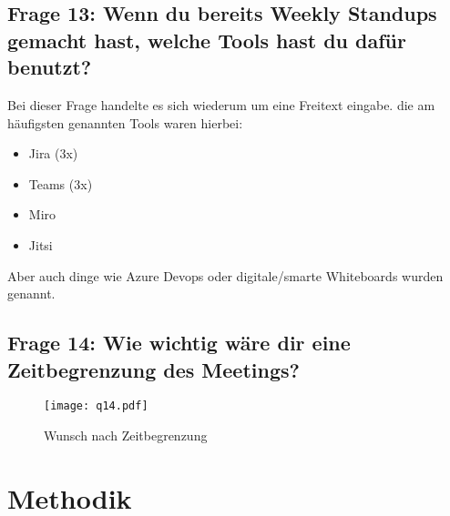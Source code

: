 \subsection{Frage 13: Wenn du bereits Weekly Standups gemacht hast, welche Tools hast du dafür benutzt?}
Bei dieser Frage handelte es sich wiederum um eine Freitext eingabe. die am häufigsten genannten Tools waren hierbei:
\begin{itemize}
    \item Jira (3x)
    \item Teams (3x)
    \item Miro
    \item Jitsi
\end{itemize}
Aber auch dinge wie Azure Devops oder digitale/smarte Whiteboards wurden genannt.

\subsection{Frage 14: Wie wichtig wäre dir eine Zeitbegrenzung des Meetings?}
\begin{figure}[H]
	\centering
	\texttt{[image: q14.pdf]}
    \caption{Wunsch nach Zeitbegrenzung}
	\label{fig:q14}
\end{figure} 
\section{Methodik}



